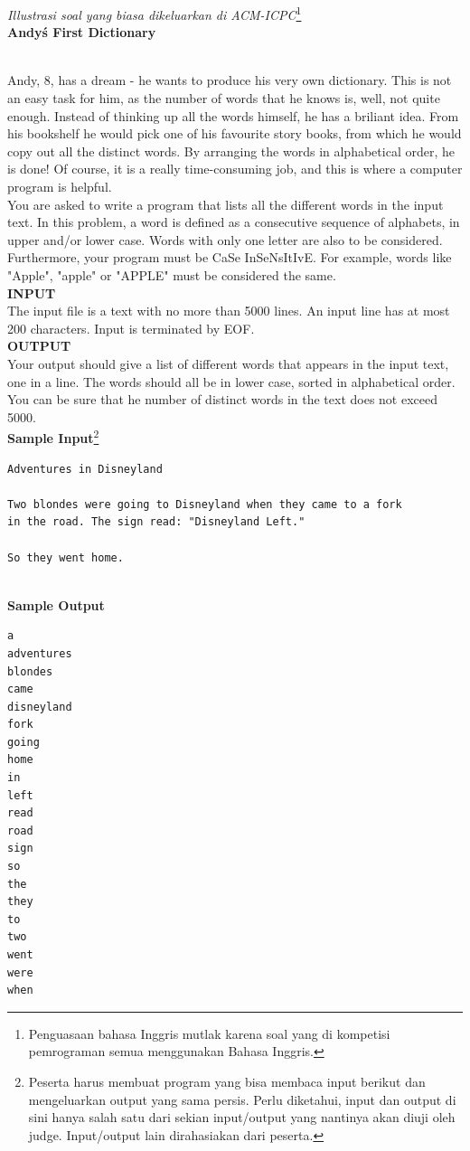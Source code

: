 \newpage
\begin{center}
\textit{Illustrasi soal yang biasa dikeluarkan di ACM-ICPC}\footnote{Penguasaan bahasa Inggris mutlak karena soal yang di kompetisi pemrograman semua menggunakan Bahasa Inggris.}\\
\textbf{Andy\'s First Dictionary}
\end{center}
\hfill\\
Andy, 8, has a dream - he wants to produce his very own dictionary. This is not an easy task for him, as the number of words that he knows is, well, not quite enough. Instead of thinking up all the words himself, he has a briliant idea. From his bookshelf he would pick one of his favourite story books, from which he would copy out all the distinct words. By arranging the words in alphabetical order, he is done! Of course, it is a really time-consuming job, and this is where a computer program is helpful.
\\
You are asked to write a program that lists all the different words in the input text. In this problem, a word is defined as a consecutive sequence of alphabets, in upper and/or lower case. Words with only one letter are also to be considered. Furthermore, your program must be CaSe InSeNsItIvE. For example, words like "Apple", "apple" or "APPLE" must be considered the same.
\\
	\textbf{INPUT}
\\
The input file is a text with no more than 5000 lines. An input line has at most 200 characters. Input is terminated by EOF.
\\
	\textbf{OUTPUT}
\\
Your output should give a list of different words that appears in the input text, one in a line. The words should all be in lower case, sorted in alphabetical order. You can be sure that he number of distinct words in the text does not exceed 5000.
\\
	\textbf{Sample Input}\footnote{Peserta harus membuat program yang bisa membaca input berikut dan mengeluarkan output yang sama persis. Perlu diketahui, input dan output di sini hanya salah satu dari sekian input/output yang nantinya akan diuji oleh judge. Input/output lain dirahasiakan dari peserta.}
\\
\begin{verbatim}	
Adventures in Disneyland

Two blondes were going to Disneyland when they came to a fork 
in the road. The sign read: "Disneyland Left."

So they went home.
\end{verbatim}
\hfill\\
	\textbf{Sample Output}
\\
\begin{verbatim}
a
adventures
blondes
came
disneyland
fork
going
home
in
left
read
road
sign
so
the
they
to
two
went
were
when
\end{verbatim}
\newpage
